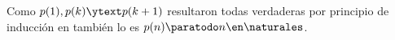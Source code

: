 \begin{enumerate}[label=\roman*)]
	      \medskip

	      Como $p(1), p(k) \ytext p(k+1)$ resultaron todas verdaderas por principio de inducción en también lo es $p(n) \paratodo n \en \naturales$.


\end{enumerate}

\begin{aportes}
	\item {}
\end{aportes}
